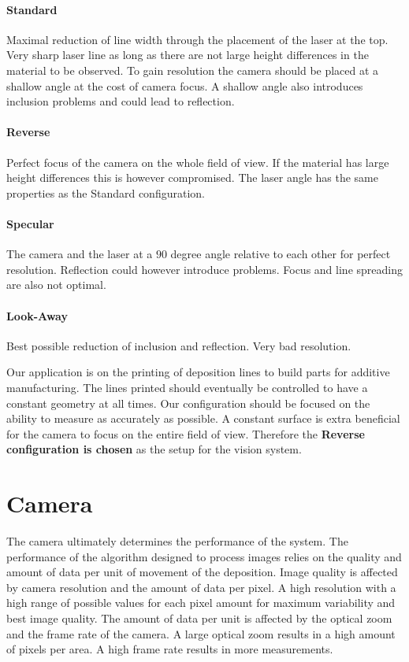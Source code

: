 \paragraph{Standard} Maximal reduction of line width through the placement of the laser at the top. Very sharp laser line as long as there are not large height differences in the material to be observed. To gain resolution the camera should be placed at a shallow angle at the cost of camera focus. A shallow angle also introduces inclusion problems and could lead to reflection.

\paragraph{Reverse} Perfect focus of the camera on the whole field of view. If the material has large height differences this is however compromised.  The laser angle has the same properties as the Standard configuration. 

\paragraph{Specular} The camera and the laser at a $90$ degree angle relative to each other for perfect resolution. Reflection could however introduce problems. Focus and line spreading are also not optimal.

\paragraph{Look-Away} Best possible reduction of inclusion and reflection. Very bad resolution.

\skippar
Our application is on the printing of deposition lines to build parts for additive manufacturing. The lines printed should eventually be controlled to have a constant geometry at all times. Our configuration should be focused on the ability to measure as accurately as possible. A constant surface is extra beneficial for the camera to focus on the entire field of view. Therefore the \textbf{Reverse configuration is chosen} as the setup for the vision system.

\section{Camera}

The camera ultimately determines the performance of the system. The performance of the algorithm designed to process images relies on the quality and amount of data per unit of movement of the deposition. Image quality is affected by camera resolution and the amount of data per pixel. A high resolution with a high range of possible values for each pixel amount for maximum variability and best image quality. The amount of data per unit is affected by the optical zoom and the frame rate of the camera. A large optical zoom results in a high amount of pixels per area. A high frame rate results in more measurements. 

